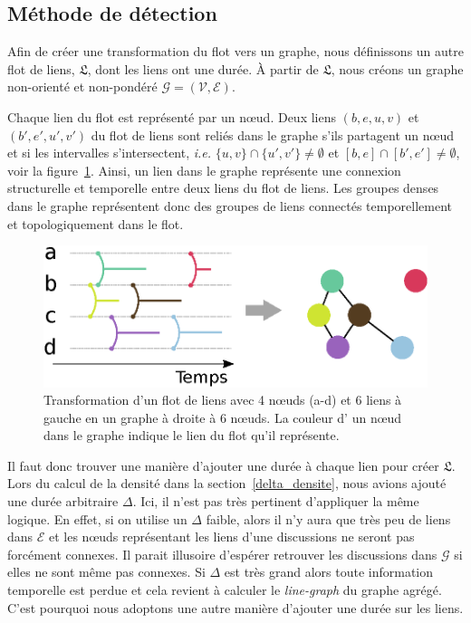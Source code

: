 \subsection{Méthode de détection}
\label{sec:fail_mailing}
Afin de créer une transformation du flot vers un graphe, nous définissons un autre flot de liens, $\mathfrak{L}$, dont les liens ont une durée.
\`A partir de $\mathfrak{L}$, nous créons un graphe non-orienté et non-pondéré $\mathcal{G} = (\mathcal{V},\mathcal{E})$.

Chaque lien du flot est représenté par un n\oe{}ud.
Deux liens $(b,e,u,v)$ et $(b',e',u',v')$ du flot de liens sont reliés dans le graphe s'ils partagent un n\oe{}ud et si les intervalles s'intersectent, \emph{i.e.} $\{u,v\} \cap \{u',v'\} \neq \emptyset$ et $[b,e]\cap[b',e'] \neq \emptyset$, voir la figure~\ref{fig:Transformation}.
Ainsi, un lien dans le graphe représente une connexion structurelle et temporelle entre deux liens du flot de liens.
Les groupes denses dans le graphe représentent donc des groupes de liens connectés temporellement et topologiquement dans le flot.

\begin{figure}
\centering
\includegraphics[width=0.55\linewidth]{img/mailing/Transformation.eps}
\caption{Transformation d'un flot de liens avec 4 n\oe{}uds (a-d) et 6 liens à gauche en un graphe à droite à 6 n\oe{}uds. La couleur d' un n\oe{}ud dans le graphe indique le lien du flot qu'il représente.}
\label{fig:Transformation}
\end{figure}%

Il faut donc trouver une manière d'ajouter une durée à chaque lien pour créer $\mathfrak{L}$.
Lors du calcul de la densité dans la section~\ref{delta_densite}, nous avions ajouté une durée arbitraire $\Delta$.
Ici, il n'est pas très pertinent d'appliquer la même logique.
En effet, si on utilise un $\Delta$ faible, alors il n'y aura que très peu de liens dans $\mathcal{E}$ et les n\oe{}uds représentant les liens d'une discussions ne seront pas forcément connexes.
Il parait illusoire d'espérer retrouver les discussions dans $\mathcal{G}$ si elles ne sont même pas connexes.
Si $\Delta$ est très grand alors toute information temporelle est perdue et cela revient à calculer le \emph{line-graph} du graphe agrégé.
C'est pourquoi nous adoptons une autre manière d'ajouter une durée sur les liens.

